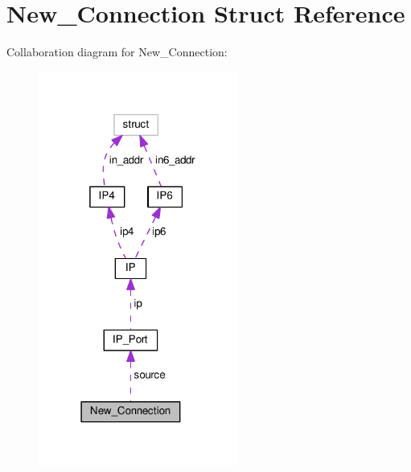 \hypertarget{struct_new___connection}{\section{New\+\_\+\+Connection Struct Reference}
\label{struct_new___connection}
}


Collaboration diagram for New\+\_\+\+Connection\+:\nopagebreak
\begin{figure}[H]
\begin{center}
\leavevmode
\includegraphics[width=186pt]{struct_new___connection__coll__graph}
\end{center}
\end{figure}
